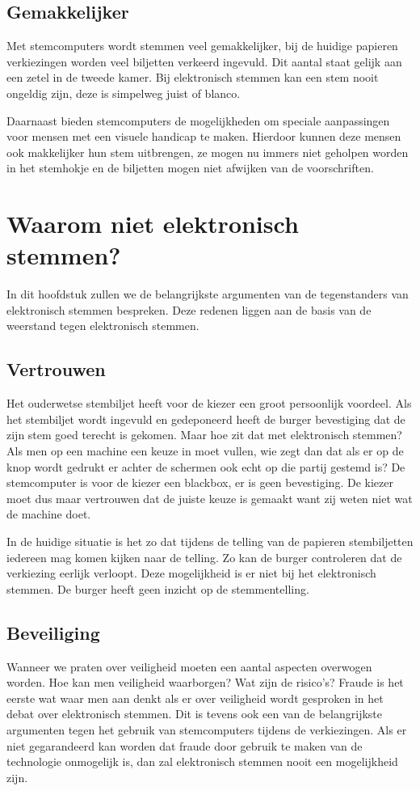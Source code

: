 \documentclass[a4paper]{article}
\begin{document}
\subsection{Gemakkelijker}
Met stemcomputers wordt stemmen veel gemakkelijker, bij de huidige papieren verkiezingen worden veel biljetten verkeerd ingevuld.
Dit aantal staat gelijk aan een zetel in de tweede kamer.
Bij elektronisch stemmen kan een stem nooit ongeldig zijn, deze is simpelweg juist of blanco.

Daarnaast bieden stemcomputers de mogelijkheden om speciale aanpassingen voor mensen met een visuele handicap te maken.
Hierdoor kunnen deze mensen ook makkelijker hun stem uitbrengen, ze mogen nu immers niet geholpen worden in het stemhokje en de biljetten mogen niet afwijken van de voorschriften.

\newpage

\section{Waarom niet elektronisch stemmen?}
\label{text:tegen}
In dit hoofdstuk zullen we de belangrijkste argumenten van de tegenstanders van elektronisch stemmen bespreken.
Deze redenen liggen aan de basis van de weerstand tegen elektronisch stemmen.

\subsection{Vertrouwen}
Het ouderwetse stembiljet heeft voor de kiezer een groot persoonlijk voordeel. 
Als het stembiljet wordt ingevuld en gedeponeerd heeft de burger bevestiging dat de zijn stem goed terecht is gekomen. 
Maar hoe zit dat met elektronisch stemmen?
Als men op een machine een keuze in moet vullen, wie zegt dan dat als er op de knop wordt gedrukt er achter de schermen ook echt op die partij gestemd is?
De stemcomputer is voor de kiezer een blackbox, er is geen bevestiging.
De kiezer moet dus maar vertrouwen dat de juiste keuze is gemaakt want zij weten niet wat de machine doet.

In de huidige situatie is het zo dat tijdens de telling van de papieren stembiljetten iedereen mag komen kijken naar de telling.
Zo kan de burger controleren dat de verkiezing eerlijk verloopt.
Deze mogelijkheid is er niet bij het elektronisch stemmen.
De burger heeft geen inzicht op de stemmentelling. 

\subsection{Beveiliging}
Wanneer we praten over veiligheid moeten een aantal aspecten overwogen worden. 
Hoe kan men veiligheid waarborgen? 
Wat zijn de risico's?
Fraude is het eerste wat waar men aan denkt als er over veiligheid wordt gesproken in het debat over elektronisch stemmen.
Dit is tevens ook een van de belangrijkste argumenten tegen het gebruik van stemcomputers tijdens de verkiezingen.
Als er niet gegarandeerd kan worden dat fraude door gebruik te maken van de technologie onmogelijk is, dan zal elektronisch stemmen nooit een mogelijkheid zijn.
\end{document}
